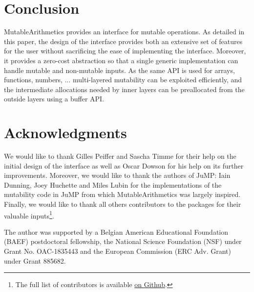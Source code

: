 \documentclass{juliacon}
\newcommand{\ma}{MutableArithmetics}
\begin{document}
\section{Conclusion}
\ma{} provides an interface for mutable operations.
As detailed in this paper, the design of the interface provides
both an extensive set of features for the user without sacrificing
the ease of implementing the interface.
Moreover, it provides a zero-cost abstraction so that a single generic
implementation can handle mutable and non-mutable inputs.
As the same API is used for arrays, functions, numbers, ... multi-layered mutability can be exploited efficiently,
and the intermediate allocations needed by inner layers can be
preallocated from the outside layers using a buffer API.

\section*{Acknowledgments}

We would like to thank Gilles Peiffer and Sascha Timme for their help on the initial design of the interface as well as Oscar Dowson for his help on its further improvements.
Moreover, we would like to thank the authors of JuMP: Iain Dunning, Joey Huchette and Miles Lubin for the implementations of the mutability code in JuMP from which MutableArithmetics was largely inspired.
Finally, we would like to thank all others contributors to the packages for their valuable inputs\footnote{The full list of contributors is available \href{https://github.com/jump-dev/MutableArithmetics.jl/graphs/contributors}{on Github}.}.

The author was supported by
a Belgian American Educational Foundation (BAEF) postdoctoral fellowship,
the National Science Foundation (NSF) under Grant No. OAC-1835443 and
the European Commission (ERC Adv. Grant) under Grant 885682.


\end{document}
